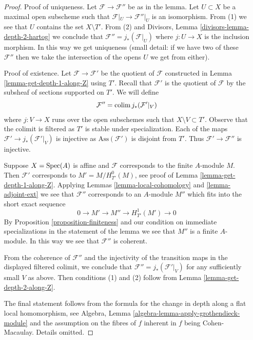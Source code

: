\begin{proof}
Proof of uniqueness. Let $\mathcal{F} \to \mathcal{F}''$
be as in the lemma. Let $U \subset X$ be a maximal open
subscheme such that $\mathcal{F}|_U \to \mathcal{F}''|_U$
is an isomorphism. From (1) we see that $U$ contains the set $X \setminus T'$.
From (2) and Divisors, Lemma \ref{divisors-lemma-depth-2-hartog}
we conclude that $\mathcal{F}'' = j_*(\mathcal{F}|_U)$ where $j : U \to X$
is the inclusion morphism.
In this way we get uniqueness (small detail: if we have two
of these $\mathcal{F}''$ then we take the intersection of the opens $U$
we get from either).

\medskip\noindent
Proof of existence. Let $\mathcal{F} \to \mathcal{F}'$ be the quotient of
$\mathcal{F}$ constructed in Lemma \ref{lemma-get-depth-1-along-Z} using $T'$.
Recall that $\mathcal{F}'$ is the quotient of $\mathcal{F}$
by the subsheaf of sections supported on $T'$. We will define
$$
\mathcal{F}'' = \mathop{\mathrm{colim}}\nolimits j_*(\mathcal{F}'|_V)
$$
where $j : V \to X$ runs over the open subschemes such that
$X \setminus V \subset T'$. Observe that the colimit is filtered
as $T'$ is stable under specialization. Each of the
maps $\mathcal{F}' \to j_*(\mathcal{F}'|_V)$ is injective
as $\text{Ass}(\mathcal{F}')$ is disjoint from $T'$.
Thus $\mathcal{F}' \to \mathcal{F}''$ is injective.

\medskip\noindent
Suppose $X = \mathop{\mathrm{Spec}}(A)$ is affine and $\mathcal{F}$
corresponds to the finite $A$-module $M$. Then $\mathcal{F}'$
corresponds to $M' = M / H^0_{T'}(M)$, see proof of
Lemma \ref{lemma-get-depth-1-along-Z}. Applying
Lemmas \ref{lemma-local-cohomology} and \ref{lemma-adjoint-ext}
we see that $\mathcal{F}''$ corresponds to an $A$-module
$M''$ which fits into the short exact sequence
$$
0 \to M' \to M'' \to H^1_{T'}(M') \to 0
$$
By Proposition \ref{proposition-finiteness} and our condition
on immediate specializations in the statement of the lemma
we see that $M''$ is a finite $A$-module. In this way
we see that $\mathcal{F}''$ is coherent.

\medskip\noindent
From the coherence of $\mathcal{F}''$ and the injectivity of the transition
maps in the displayed filtered colimit, we conclude that
$\mathcal{F}'' = j_*(\mathcal{F}'|_V)$ for any sufficiently small $V$ as above.
Then conditions (1) and (2) follow from Lemma \ref{lemma-get-depth-2-along-Z}.

\medskip\noindent
The final statement follows from the formula for the change in
depth along a flat local homomorphism, see
Algebra, Lemma \ref{algebra-lemma-apply-grothendieck-module}
and the assumption on the fibres of $f$ inherent in $f$ being
Cohen-Macaulay. Details omitted.
\end{proof}

